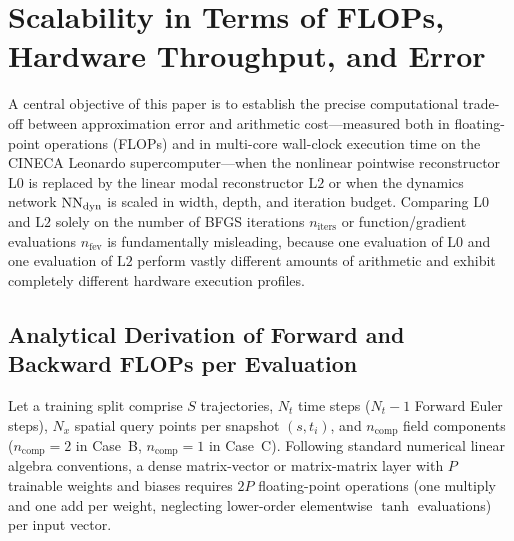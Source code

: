 \section{Scalability in Terms of FLOPs, Hardware Throughput, and Error}
\label{sec:flops}

A central objective of this paper is to establish the precise computational trade-off between approximation error and arithmetic cost---measured both in floating-point operations (FLOPs) and in multi-core wall-clock execution time on the CINECA Leonardo supercomputer---when the nonlinear pointwise reconstructor $\mathrm{L0}$ is replaced by the linear modal reconstructor $\mathrm{L2}$ or when the dynamics network $\mathrm{NN}_{\mathrm{dyn}}$ is scaled in width, depth, and iteration budget. Comparing $\mathrm{L0}$ and $\mathrm{L2}$ solely on the number of BFGS iterations $n_{\mathrm{iters}}$ or function/gradient evaluations $n_{\mathrm{fev}}$ is fundamentally misleading, because one evaluation of $\mathrm{L0}$ and one evaluation of $\mathrm{L2}$ perform vastly different amounts of arithmetic and exhibit completely different hardware execution profiles.

\subsection{Analytical Derivation of Forward and Backward FLOPs per Evaluation}
\label{sec:flops_derivation}

Let a training split comprise $S$ trajectories, $N_t$ time steps ($N_t - 1$ Forward Euler steps), $N_x$ spatial query points per snapshot $(s,t_i)$, and $n_{\mathrm{comp}}$ field components ($n_{\mathrm{comp}} = 2$ in Case~B, $n_{\mathrm{comp}} = 1$ in Case~C). Following standard numerical linear algebra conventions, a dense matrix-vector or matrix-matrix layer with $P$ trainable weights and biases requires $2P$ floating-point operations (one multiply and one add per weight, neglecting lower-order elementwise $\tanh$ evaluations) per input vector.

